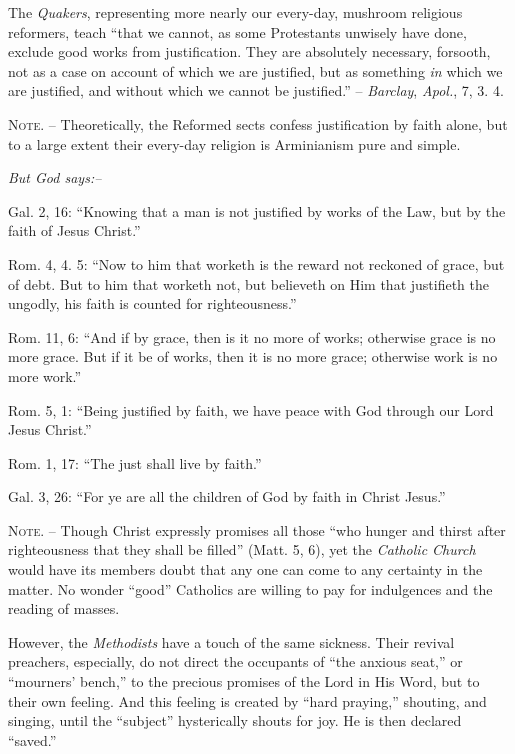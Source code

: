 \documentclass[
]{book}
\begin{document}
The \emph{Quakers}, representing more nearly our every-day, mushroom religious reformers, teach ``that we cannot, as some Protestants unwisely have done, exclude good works from justification. They are absolutely necessary, forsooth, not as a case on account of which we are justified, but as something \emph{in} which we are justified, and without which we cannot be justified.'' -- \emph{Barclay}, \emph{Apol.}, 7, 3. 4.

\textsc{Note.} -- Theoretically, the Reformed sects confess justification by faith alone, but to a large extent their every-day religion is Arminianism pure and simple.

\begin{center}
\textsl{But God says:--}
\end{center}

Gal. 2, 16: ``Knowing that a man is not justified by works of the Law, but by the faith of Jesus Christ.''

Rom. 4, 4. 5: ``Now to him that worketh is the reward not reckoned of grace, but of debt. But to him that worketh not, but believeth on Him that justifieth the ungodly, his faith is counted for righteousness.''

Rom. 11, 6: ``And if by grace, then is it no more of works; otherwise grace is no more grace. But if it be of works, then it is no more grace; otherwise work is no more work.''

Rom. 5, 1: ``Being justified by faith, we have peace with God through our Lord Jesus Christ.''

Rom. 1, 17: ``The just shall live by faith.''

Gal. 3, 26: ``For ye are all the children of God by faith in Christ Jesus.''

\textsc{Note.} -- Though Christ expressly promises all those ``who hunger and thirst after righteousness that they shall be filled'' (Matt. 5, 6), yet the \emph{Catholic Church} would have its members doubt that any one can come to any certainty in the matter. No wonder ``good'' Catholics are willing to pay for indulgences and the reading of masses.

However, the \emph{Methodists} have a touch of the same sickness. Their revival preachers, especially, do not direct the occupants of ``the anxious seat,'' or ``mourners' bench,'' to the precious promises of the Lord in His Word, but to their own feeling. And this feeling is created by ``hard praying,'' shouting, and singing, until the ``subject'' hysterically shouts for joy. He is then declared ``saved.''
\end{document}
